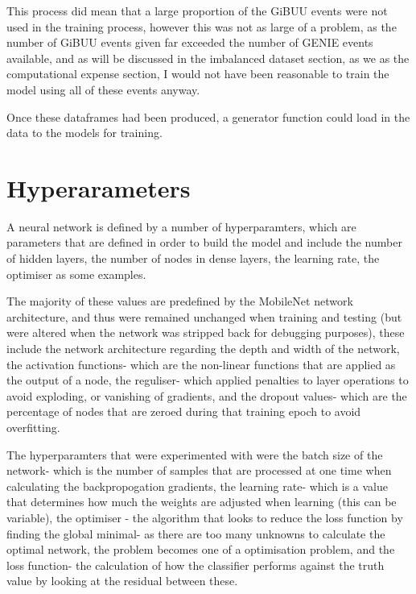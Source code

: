 \noindent This process did mean that a large proportion of the GiBUU events were not used in the training process, however this was not as large of a problem, as the number of GiBUU events given far exceeded the number of GENIE events available, and as will be discussed in the imbalanced dataset section, as we as the computational expense section, I would not have been reasonable to train the model using all of these events anyway.\medskip

\noindent Once these dataframes had been produced, a generator function could load in the data to the models for training.

\section{Hyperarameters}

\noindent A neural network is defined by a number of hyperparamters, which are parameters that are defined in order to build the model and include the number of hidden layers, the number of nodes in dense layers, the learning rate, the optimiser as some examples.\medskip

\noindent The majority of these values are predefined by the MobileNet network architecture, and thus were remained unchanged when training and testing (but were altered when the network was stripped back for debugging purposes), these include the network architecture regarding the depth and width of the network, the activation functions- which are the non-linear functions that are applied as the output of a node, the reguliser- which applied penalties to layer operations to avoid exploding, or vanishing of gradients, and the dropout values- which are the percentage of nodes that are zeroed during that training epoch to avoid overfitting. \medskip

\noindent The hyperparamters that were experimented with were the batch size of the network- which is the number of samples that are processed at one time when calculating the backpropogation gradients, the learning rate- which is a value that determines how much the weights are adjusted when learning (this can be variable), the optimiser - the algorithm that looks to reduce the loss function by finding the global minimal- as there are too many unknowns to calculate the optimal network, the problem becomes one of a  optimisation problem, and the loss function- the calculation of how the classifier performs against the truth value by looking at the residual between these. \medskip


